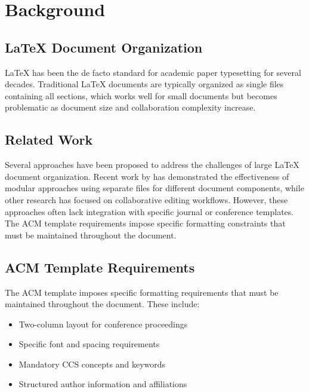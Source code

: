 
\section{Background}\label{sec:background}

\subsection{LaTeX Document Organization}

LaTeX has been the de facto standard for academic paper typesetting for several decades. 
Traditional LaTeX documents are typically organized as single files containing all sections, 
which works well for small documents but becomes problematic as document size and 
collaboration complexity increase.

\subsection{Related Work}

Several approaches have been proposed to address the challenges of large LaTeX document 
organization. Recent work by \cite{latex2023} has demonstrated the effectiveness of modular 
approaches using separate files for different document components, while other research 
has focused on collaborative editing workflows. However, these approaches often lack 
integration with specific journal or conference templates. The ACM template requirements 
\cite{acmwebsite2024} impose specific formatting constraints that must be maintained 
throughout the document.

\subsection{ACM Template Requirements}

The ACM template imposes specific formatting requirements that must be maintained 
throughout the document. These include:
\begin{itemize}
    \item Two-column layout for conference proceedings
    \item Specific font and spacing requirements
    \item Mandatory CCS concepts and keywords
    \item Structured author information and affiliations
\end{itemize}

